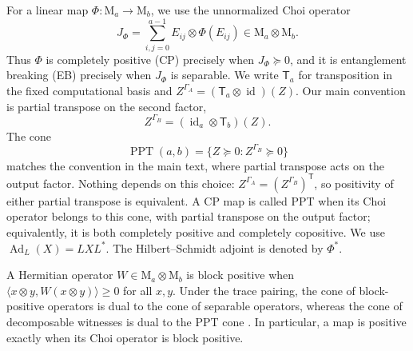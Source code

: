 \documentclass[aps,prl,reprint,superscriptaddress,nofootinbib]{revtex4-2}
\newcommand{\M}{\mathrm{M}}
\newcommand{\id}{\operatorname{id}}
\newcommand{\Ad}{\operatorname{Ad}}
\newcommand{\PPT}{\operatorname{PPT}}
\newcommand{\Tmap}{\mathsf T}
\begin{document}
For a linear map \(\Phi:\M_a\to\M_b\), we use the unnormalized Choi
operator
\begin{equation}
 J_\Phi=\sum_{i,j=0}^{a-1}E_{ij}\otimes\Phi(E_{ij})
 \in\M_a\otimes\M_b .
\label{sm:eq:choi}
\end{equation}
Thus \(\Phi\) is completely positive (CP) precisely when
\(J_\Phi\succeq0\), and it is entanglement breaking (EB) precisely when
\(J_\Phi\) is separable.  We write \(\Tmap_a\) for transposition in the
fixed computational basis and \(Z^{\Gamma_A}=(\Tmap_a\otimes\id)(Z)\).
Our main convention is partial transpose on the second factor,
\begin{equation}
 Z^{\Gamma_B}=(\id_a\otimes\Tmap_b)(Z).
\label{sm:eq:secondpt}
\end{equation}
The cone
\begin{equation}
 \PPT(a,b)=\{Z\succeq0:Z^{\Gamma_B}\succeq0\}
\label{sm:eq:pptcone}
\end{equation}
matches the convention in the main text, where partial transpose acts on the
output factor.  Nothing depends
on this choice: \(Z^{\Gamma_A}=(Z^{\Gamma_B})^{\mathsf T}\), so positivity
of either partial transpose is equivalent.  A CP map is called PPT when
its Choi operator belongs to this cone, with partial transpose on the
output factor; equivalently, it is both completely positive and
completely copositive.  We use
\(\Ad_L(X)=LXL^*\).  The Hilbert--Schmidt adjoint is denoted by
\(\Phi^*\).

A Hermitian operator \(W\in\M_a\otimes\M_b\) is block positive when
\(\langle x\otimes y,W(x\otimes y)\rangle\geq0\) for all \(x,y\).
Under the trace pairing, the cone of block-positive operators is dual to the
cone of separable operators, whereas the cone of decomposable witnesses is
dual to the PPT cone
\cite{Horodecki1996}.  In particular, a map is positive exactly when
its Choi operator is block positive.
\end{document}
